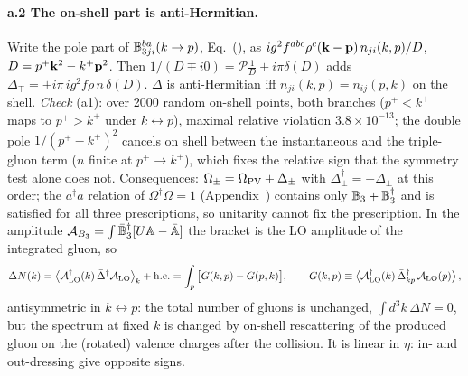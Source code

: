 \paragraph{a.2 The on-shell part is anti-Hermitian.} Write the pole part of $\mathbb{B}^{ba}_{3ji}(k\to p)$, Eq.~(), as $ig^2f^{abc}\rho^c(\mathbf{k}-\mathbf{p})\,n_{ji}(k,p)/D$, $D=p^+\mathbf{k}^2-k^+\mathbf{p}^2$. Then $1/(D\mp i0)=\mathcal P\frac1D\pm i\pi\delta(D)$ adds $\Delta_\mp=\pm i\pi\,ig^2f\rho\,n\,\delta(D)$. $\Delta$ is anti-Hermitian iff $n_{ji}(k,p)=n_{ij}(p,k)$ on the shell. \emph{Check} (a1): over 2000 random on-shell points, both branches ($p^+<k^+$ maps to $p^+>k^+$ under $k\leftrightarrow p$), maximal relative violation $3.8\times10^{-13}$; the double pole $1/(p^+-k^+)^2$ cancels on shell between the instantaneous and the triple-gluon term ($n$ finite at $p^+\to k^+$), which fixes the relative sign that the symmetry test alone does not. Consequences: $\Omega_\pm=\Omega_{\rm PV}+\Delta_\pm$ with $\Delta_\pm^\dagger=-\Delta_\pm$ at this order; the $a^\dagger a$ relation of $\Omega^\dagger\Omega=1$ (Appendix~) contains only $\mathbb{B}_3+\mathbb{B}_3^\dagger$ and is satisfied for all three prescriptions, so unitarity cannot fix the prescription. In the amplitude $\mathcal A_{B_3}=\int\bar{\mathbb{B}}_3^\dagger[U\mathbb{A}-\bar{\mathbb{A}}]$ the bracket is the LO amplitude of the integrated gluon, so
\begin{align}\label{pr:DNgen}
\Delta N(k)=\big\langle\mathcal A_{\rm LO}^\dagger(k)\,\bar\Delta^\dagger\mathcal A_{\rm LO}\big\rangle_k+{\rm h.c.}=\int_p\big[G(k,p)-G(p,k)\big],\qquad G(k,p)\equiv\big\langle\mathcal A_{\rm LO}^\dagger(k)\,\bar\Delta^\dagger_{kp}\,\mathcal A_{\rm LO}(p)\big\rangle\,,
\end{align}
antisymmetric in $k\leftrightarrow p$: the total number of gluons is unchanged, $\int d^3k\,\Delta N=0$, but the spectrum at fixed $k$ is changed by on-shell rescattering of the produced gluon on the (rotated) valence charges after the collision. It is linear in $\eta$: in- and out-dressing give opposite signs.

